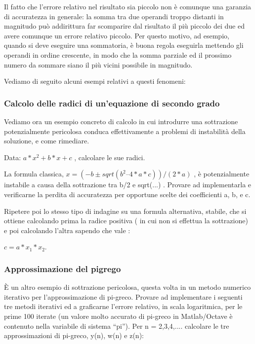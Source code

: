Il fatto che l’errore relativo nel risultato sia piccolo non è comunque una garanzia di accuratezza  in generale: la somma tra due operandi troppo distanti in magnitudo può addirittura far scomparire dal risultato il più piccolo dei due ed avere comunque un errore relativo piccolo. Per questo motivo, ad esempio,  quando si deve eseguire una sommatoria, è buona regola eseguirla mettendo gli operandi in ordine crescente, in modo che la somma parziale ed il prossimo numero da sommare siano il più vicini possibile in magnitudo.

Vediamo di seguito alcuni esempi relativi a questi fenomeni:

\subsubsection{Calcolo delle radici di un’equazione di secondo grado}

Vediamo ora un esempio concreto di calcolo in cui introdurre una sottrazione potenzialmente pericolosa conduca effettivamente a problemi di instabilità della soluzione, e come rimediare.

Data: $a*x^2 + b*x +c$ , calcolare le sue radici.

La formula classica, $x = (- b \pm sqrt(b^2 – 4*a*c))/(2*a)$ , è potenzialmente instabile a causa della sottrazione tra b/2 e sqrt(...) . Provare ad implementarla e verificarne la perdita di accuratezza per opportune scelte dei coefficienti a, b, e c.

Ripetere poi lo stesso tipo di indagine su una formula alternativa, stabile, che si ottiene calcolando prima la radice positiva ( in cui non si effettua la sottrazione) e poi calcolando l’altra sapendo che vale :  

\begin{center}
	$c = a * x_1 * x_2$.
\end{center}



\subsubsection{Approssimazione del pigrego}

È un altro esempio di sottrazione pericolosa, questa volta in un metodo numerico iterativo per l’approssimazione di pi-greco. Provare ad implementare i seguenti tre metodi iterativi ed a graficarne l’errore relativo, in scala logaritmica, per le prime 100 iterate (un valore molto accurato di pi-greco in Matlab/Octave è contenuto nella variabile di sistema “pi”). Per n = 2,3,4,.... calcolare le tre approssimazioni di pi-greco, y(n), w(n) e z(n):

